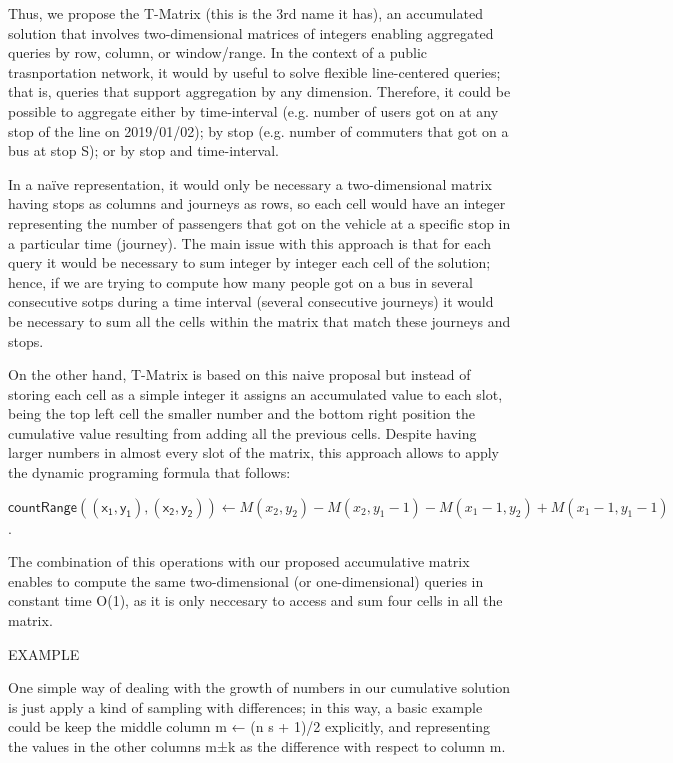 \documentclass[runningheads]{llncs}
\begin{document}
Thus, we propose the T-Matrix (this is the 3rd name it has), an accumulated solution that involves two-dimensional matrices of integers enabling aggregated queries by row, column, or window/range. In the context of a public trasnportation network, it would by useful to solve flexible line-centered queries; that is, queries that support aggregation by any dimension. Therefore, it could be possible to aggregate either by time-interval (e.g. number of users got on at any stop of the line on 2019/01/02); by stop (e.g. number of commuters that got on a bus at stop S); or by stop and time-interval.

In a naïve representation, it would only be necessary a two-dimensional matrix having stops as columns and journeys as rows, so each cell would have an integer representing the number of passengers that got on the vehicle at a specific stop in a particular time (journey). The main issue with this approach is that for each query it would be necessary to sum integer by integer each cell of the solution; hence, if we are trying to compute how many people got on a bus in several consecutive sotps during a time interval (several consecutive journeys) it would be necessary to sum all the cells within the matrix that match these journeys and stops.

On the other hand, T-Matrix is based on this naive proposal but instead of storing each cell as a simple integer it assigns an accumulated value to each slot, being the top left cell the smaller number and the bottom right position the cumulative value resulting from adding all the previous cells. Despite having larger numbers in almost every slot of the matrix, this approach allows to apply the dynamic programing formula that follows:

$\mathsf{countRange((x_1,y_1),(x_2,y_2))} \leftarrow {M(x_2,y_2)} - {M(x_2,y_1-1)} - {M(x_1-1,y_2)} + {M(x_1-1,y_1-1)}$.

The combination of this operations with our proposed accumulative matrix enables to compute the same two-dimensional (or one-dimensional) queries in constant time O(1), as it is only neccesary to access and sum four cells in all the matrix.

EXAMPLE

One simple way of dealing with the growth of numbers in our cumulative solution is just apply a kind of sampling with differences; in this way, a basic example could be keep the middle column m ← (n s + 1)/2 explicitly, and representing the values in the other columns m±k as the difference with respect to column m.
\end{document}
